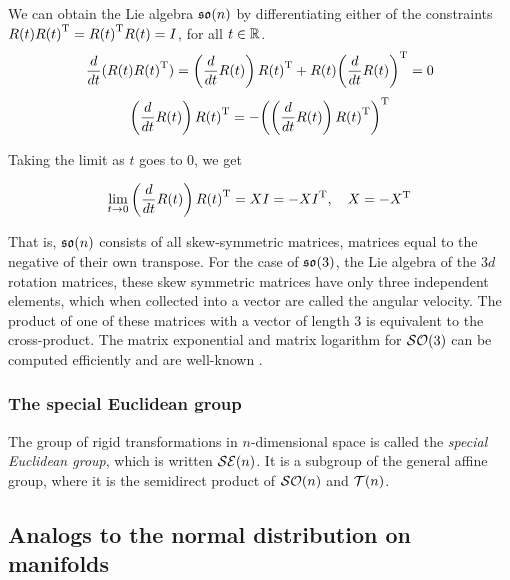 \documentclass[../main.tex]{subfiles}
\begin{document}
\begin{refsection}
We can obtain the Lie algebra $\mathfrak{so}(n)$ by differentiating either of the constraints $\mat{R}(t) \trans{\mat{R}(t)} = \trans{\mat{R}(t)} \mat{R}(t) = \mat{I}$, for all $t \in \mathbb{R}$.
\[\frac{d}{dt} (\mat{R}(t) \trans{\mat{R}(t)}) = \left(\frac{d}{dt}\mat{R}(t)\right) \trans{\mat{R}(t)} + \mat{R}(t) \trans{\left(\frac{d}{dt}\mat{R}(t) \right)} = \mat{0}\]
\[\left(\frac{d}{dt}\mat{R}(t)\right) \trans{\mat{R}(t)} = -\trans{\left(\left(\frac{d}{dt}\mat{R}(t)\right) \trans{\mat{R}(t)}\right)}\]

Taking the limit as $t$ goes to 0, we get

\[\lim_{t \to 0} \left(\frac{d}{dt}\mat{R}(t)\right) \trans{\mat{R}(t)} = \mat{X} \mat{I} = - \trans{\mat{X} \mat{I}}, \quad \mat{X} = -\trans{\mat{X}}\]

That is, $\mathfrak{so}(n)$ consists of all skew-symmetric matrices, matrices equal to the negative of their own transpose.
For the case of $\mathfrak{so}(3)$, the Lie algebra of the $3d$ rotation matrices, these skew symmetric matrices have only three independent elements, which when collected into a vector are called the angular velocity.
The product of one of these matrices with a vector of length 3 is equivalent to the cross-product.
The matrix exponential and matrix logarithm for $\mathcal{SO}(3)$ can be computed efficiently and are well-known \cite{chirikjian_harmonic_2016}.

\subsubsection{The special Euclidean group}\label{the-special-euclidean-group}

The group of rigid transformations in $n$-dimensional space is called the \emph{special Euclidean group}, which is written $\mathcal{SE}(n)$.
It is a subgroup of the general affine group, where it is the semidirect product of $\mathcal{SO}(n)$ and $\mathcal{T}(n)$.

\subsection{Analogs to the normal distribution on manifolds}\label{analogs-to-the-normal-distribution-on-manifolds}


\end{refsection}
\end{document}
